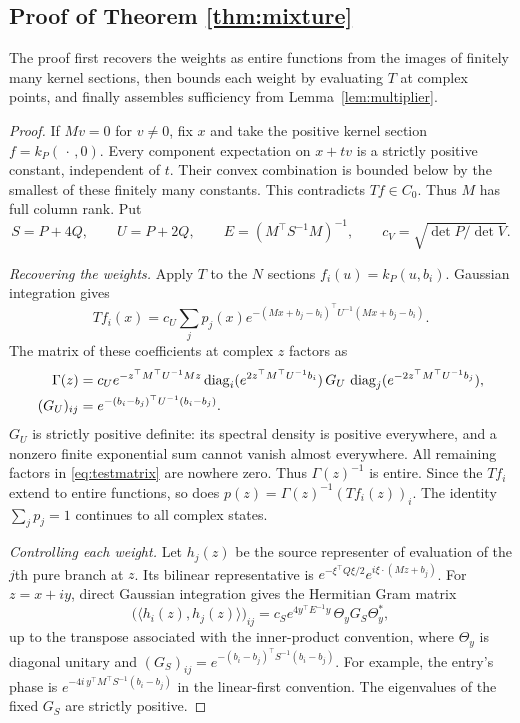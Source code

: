\documentclass[11pt,a4paper]{article}
\theoremstyle{remark}
\newcommand{\diag}{\operatorname{diag}}
\begin{document}
\subsection{Proof of Theorem \ref{thm:mixture}}

The proof first recovers the weights as entire functions from the
images of finitely many kernel sections, then bounds each weight by
evaluating $T$ at complex points, and finally assembles sufficiency
from Lemma~\ref{lem:multiplier}.

\begin{proof}
If $Mv=0$ for $v\ne0$, fix $x$ and take the positive kernel
section $f=k_P(\,\cdot\,,0)$. Every component expectation on
$x+tv$ is a strictly positive constant, independent of $t$.
Their convex combination is bounded below by the smallest
of these finitely many constants. This contradicts
$Tf\in C_0$. Thus $M$ has full column rank. Put
\[
 S=P+4Q,\qquad U=P+2Q,\qquad
 E=(M^\top S^{-1}M)^{-1},\qquad
 c_V=\sqrt{\det P/\det V}.
\]

\emph{Recovering the weights.}
Apply $T$ to the $N$ sections $f_i(u)=k_P(u,b_i)$.
Gaussian integration gives
\[
 Tf_i(x)=c_U\sum_jp_j(x)
   e^{-(Mx+b_j-b_i)^\top U^{-1}(Mx+b_j-b_i)}.
\]
The matrix of these coefficients at complex $z$ factors as
\begin{align}\label{eq:testmatrix}
 \Gamma(z)={}&c_Ue^{-z^\top M^\top U^{-1}Mz}
 \diag_i(e^{2z^\top M^\top U^{-1}b_i})\,G_U\,
 \diag_j(e^{-2z^\top M^\top U^{-1}b_j}),\\
 (G_U)_{ij}={}&e^{-(b_i-b_j)^\top U^{-1}(b_i-b_j)}.\notag
\end{align}
$G_U$ is strictly positive definite: its spectral density is
positive everywhere, and a nonzero finite exponential sum
cannot vanish almost everywhere. All remaining factors in
\eqref{eq:testmatrix} are nowhere zero. Thus $\Gamma(z)^{-1}$ is
entire. Since the $Tf_i$ extend to entire functions, so does
$p(z)=\Gamma(z)^{-1}(Tf_i(z))_i$. The identity $\sum_jp_j=1$
continues to all complex states.

\emph{Controlling each weight.}
Let $h_j(z)$ be the source representer of evaluation of the $j$th pure
branch at $z$. Its bilinear representative is
$e^{-\xi^\top Q\xi/2}e^{i\xi\cdot(Mz+b_j)}$.
For $z=x+iy$, direct Gaussian integration gives the Hermitian
Gram matrix
\begin{equation}\label{eq:unitarygram}
 \bigl(\langle h_i(z),h_j(z)\rangle\bigr)_{ij}
 =c_Se^{4y^\top E^{-1}y}\,\Theta_yG_S\Theta_y^*,
\end{equation}
up to the transpose associated with the inner-product convention,
where $\Theta_y$ is diagonal unitary and
$(G_S)_{ij}=e^{-(b_i-b_j)^\top S^{-1}(b_i-b_j)}$.
For example, the entry's phase is
$e^{-4i\,y^\top M^\top S^{-1}(b_i-b_j)}$ in the
linear-first convention. The eigenvalues of the fixed
$G_S$ are strictly positive.


\end{proof}
\end{document}
